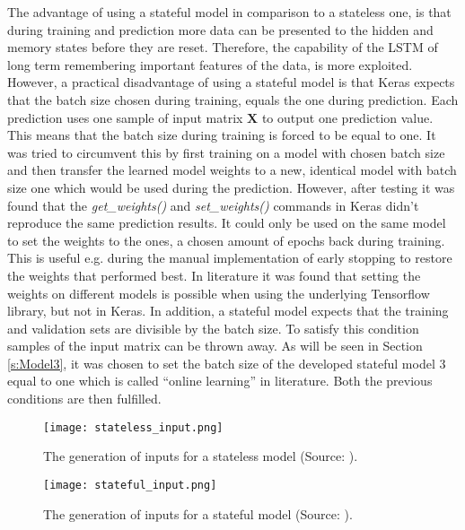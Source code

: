 The advantage of using a stateful model in comparison to a stateless one, is that during training and prediction more data can be presented to the hidden and memory states before they are reset. Therefore, the capability of the LSTM of long term remembering important features of the data, is more exploited. However, a practical disadvantage of using a stateful model is that Keras expects that the batch size chosen during training, equals the one during prediction. Each prediction uses one sample of input matrix $ \bm{X} $ to output one prediction value. This means that the batch size during training is forced to be equal to one. It was tried to circumvent this by first training on a model with chosen batch size and then transfer the learned model weights to a new, identical model with batch size one which would be used during the prediction. However, after testing it was found that the \textit{get\_weights()} and \textit{set\_weights()} commands in Keras didn't reproduce the same prediction results. It could only be used on the same model to set the weights to the ones, a chosen amount of epochs back during training. This is useful e.g. during the manual implementation of early stopping to restore the weights that performed best. In literature it was found that setting the weights on different models is possible when using the underlying Tensorflow library, but not in Keras. In addition, a stateful model expects that the training and validation sets are divisible by the batch size. To satisfy this condition samples of the input matrix can be thrown away. As will be seen in Section \ref{s:Model3}, it was chosen to set the batch size of the developed stateful model 3 equal to one which is called ``online learning'' in literature. Both the previous conditions are then fulfilled.\\

\begin{figure}[h]
	\centering
	\texttt{[image: stateless\_input.png]}
	\caption{The generation of inputs for a stateless model (Source: \cite{FneishMo}).}
	\label{fig:stateless_input}
\end{figure}

\begin{figure}[h]
	\centering
	\texttt{[image: stateful\_input.png]}
	\caption{The generation of inputs for a stateful model (Source: \cite{FneishMo}).}
	\label{fig:stateful_input}
\end{figure}

